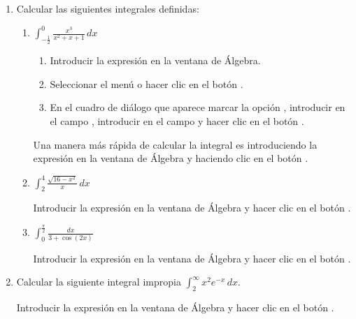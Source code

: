\begin{enumerate}[leftmargin=*]
\item Calcular las siguientes integrales definidas:
\begin{enumerate}
\item $\displaystyle \int_{-\frac{1}{2}}^0 \frac{x^{3}}{x^{2}+x+1}\,dx$
\begin{indicacion}
\begin{enumerate}
\item Introducir la expresión  en la ventana de Álgebra.
\item Seleccionar el menú  o hacer clic en el botón .
\item En el cuadro de diálogo que aparece marcar la opción , introducir  en el campo , introducir  en el campo  y hacer clic en el botón .
\end{enumerate}
Una manera más rápida de calcular la integral es introduciendo la expresión  en la ventana de Álgebra y haciendo clic en el botón .
\end{indicacion}

\item $\displaystyle \int_2^4 \frac{\sqrt{16-x^{2}}}{x}\,dx$
\begin{indicacion}
Introducir la expresión  en la ventana de Álgebra y hacer clic en el botón .
\end{indicacion}

\item $\displaystyle \int_0^{\frac{\pi}{2}} \frac{dx}{3+\cos(2x)}$
\begin{indicacion}
Introducir la expresión  en la ventana de Álgebra y hacer clic en el botón .
\end{indicacion}
\end{enumerate}

\item Calcular la siguiente integral impropia
$\int_2^{\infty} x^2e^{-x}\,dx$.
\begin{indicacion}
Introducir la expresión  en la ventana de Álgebra y hacer clic en el botón .
\end{indicacion}




\end{enumerate}
